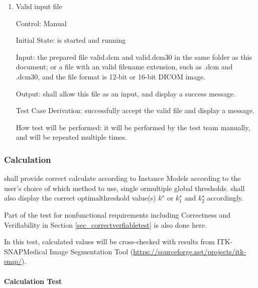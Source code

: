 \documentclass[12pt, titlepage]{article}
\begin{document}
\begin{enumerate}
\item{Valid input file}

Control: Manual
					
Initial State: \progname{} is started and running
					
Input: the prepared file valid.dcm and valid.dcm30 in the same folder as this
document; or a file with an valid filename extension, such as .dcm and .dcm30,
and the file format is 12-bit or 16-bit DICOM image.
					
Output: \progname{} shall allow this file as an input, and display a success
message.

Test Case Derivation: successfully accept the valid file and display a message.

How test will be performed: it will be performed by the test team manually, and
will be repeated multiple times.
\end{enumerate}

\subsubsection{Calculation}
\label{sec_caltest} \progname{} shall provide correct calculate according to
Instance Models according to the user's choice of which method to use, single
ormultiple global thresholds. \progname{} shall also display the correct
optimalthreshold value(s) $k^{\star}$ or $k^{\star}_{1}$ and $k^{\star}_{2}$
accordingly.

Part of the test for nonfunctional requirements including Correctness and
Verifiability in Section \ref{sec_correctverfiabletest} is also done here.

In this test, calculated values will be cross-checked with results from
ITK-SNAPMedical Image Segmentation Tool
(\url{https://sourceforge.net/projects/itk-snap/}). 
\paragraph{Calculation Test}
\end{document}
